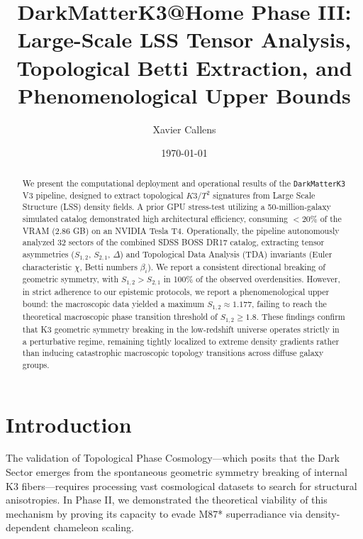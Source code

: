 \documentclass[aps,prd,twocolumn,nofootinbib,superscriptaddress,10pt]{revtex4-2}
\begin{document}
\title{DarkMatterK3@Home Phase III: Large-Scale LSS Tensor Analysis, \\ Topological Betti Extraction, and Phenomenological Upper Bounds}

\author{Xavier Callens}

\date{\today}

\begin{abstract}
We present the computational deployment and operational results of the \texttt{DarkMatterK3} V3 pipeline, designed to extract topological $K3/T^2$ signatures from Large Scale Structure (LSS) density fields. A prior GPU stress-test utilizing a 50-million-galaxy simulated catalog demonstrated high architectural efficiency, consuming $<20\%$ of the VRAM (2.86 GB) on an NVIDIA Tesla T4. Operationally, the pipeline autonomously analyzed 32 sectors of the combined SDSS BOSS DR17 catalog, extracting tensor asymmetries ($S_{1,2}$, $S_{2,1}$, $\Delta$) and Topological Data Analysis (TDA) invariants (Euler characteristic $\chi$, Betti numbers $\beta_i$). We report a consistent directional breaking of geometric symmetry, with $S_{1,2} > S_{2,1}$ in 100\% of the observed overdensities. However, in strict adherence to our epistemic protocols, we report a phenomenological upper bound: the macroscopic data yielded a maximum $S_{1,2} \approx 1.177$, failing to reach the theoretical macroscopic phase transition threshold of $S_{1,2} \ge 1.8$. These findings confirm that K3 geometric symmetry breaking in the low-redshift universe operates strictly in a perturbative regime, remaining tightly localized to extreme density gradients rather than inducing catastrophic macroscopic topology transitions across diffuse galaxy groups.
\end{abstract}

\maketitle

\section{Introduction}

The validation of Topological Phase Cosmology---which posits that the Dark Sector emerges from the spontaneous geometric symmetry breaking of internal K3 fibers---requires processing vast cosmological datasets to search for structural anisotropies. In Phase II, we demonstrated the theoretical viability of this mechanism by proving its capacity to evade M87* superradiance via density-dependent chameleon scaling.
\end{document}
